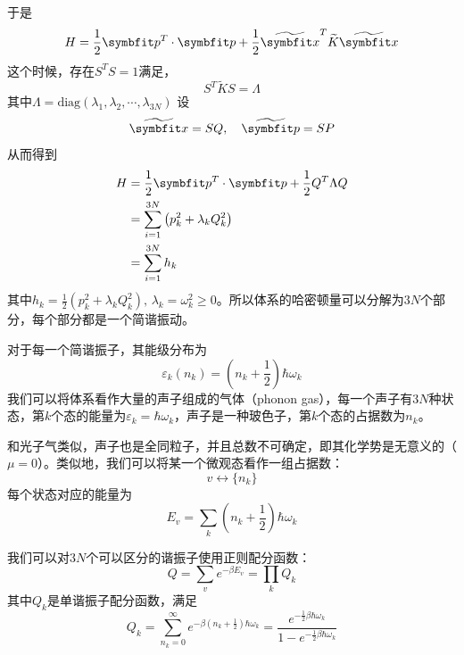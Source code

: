 于是\begin{equation}
    H=\frac{1}{2} \bd{p}^T \cdot \bd{p}+\frac{1}{2} \widetilde{\bd{x}}^T\widetilde{K} \widetilde{\bd{x}}
\end{equation}
这个时候，存在$S^T S=1$满足，\begin{equation}
    S^T \widetilde{K} S=\Lambda
\end{equation}
其中$\Lambda=\mathrm{diag}(\lambda_1,\lambda_2,\cdots,\lambda_{3N})$
设\begin{equation}
    \widetilde{\bd{x}}=SQ,\quad \widetilde{\bd{p}}=SP
\end{equation}
从而得到\begin{equation}
\begin{aligned}
    H&=\frac{1}{2}\bd{p}^T \cdot \bd{p} +\frac{1}{2}Q^T \Lambda Q\\
    &=\sum_{i=1}^{3N} \left(p_k^2 +\lambda_k Q_k^2\right)\\
    &=\sum_{i=1}^{3N} h_k    
\end{aligned}
\end{equation}
其中$h_k=\frac{1}{2}(p_k^2+\lambda_k Q_k^2),\,\lambda_k=\omega_k^2\ge 0$。所以体系的哈密顿量可以分解为$3N$个部分，每个部分都是一个简谐振动。

对于每一个简谐振子，其能级分布为\begin{equation}
    \varepsilon_k(n_k)=(n_k+\frac{1}{2}) \hbar \omega_k
\end{equation}
我们可以将体系看作大量的声子组成的气体（phonon gas），每一个声子有$3N$种状态，第$k$个态的能量为$\varepsilon_k=\hbar \omega_k$，声子是一种玻色子，第$k$个态的占据数为$n_k$。

和光子气类似，声子也是全同粒子，并且总数不可确定，即其化学势是无意义的（$\mu=0$）。类似地，我们可以将某一个微观态看作一组占据数：\begin{equation}
    v \leftrightarrow \{n_k\}
\end{equation}
每个状态对应的能量为\begin{equation}
    E_v =\sum_k (n_k +\frac{1}{2}) \hbar \omega_k
\end{equation}

我们可以对$3N$个可以区分的谐振子使用正则配分函数：\begin{equation}
    Q=\sum_v e^{-\beta E_v} =\prod_k Q_k
\end{equation}
其中$Q_k$是单谐振子配分函数，满足\begin{equation}
    Q_k =\sum_{n_k=0}^{\infty} e^{-\beta (n_k +\frac{1}{2})\hbar \omega_k} =\frac{e^{-\frac{1}{2}\beta \hbar \omega_k}}{1-e^{-\frac{1}{2}\beta \hbar \omega_k}}
\end{equation}

